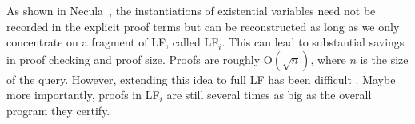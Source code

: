 \documentclass{llncs}
\newcommand{\figfoot}{\vspace{1ex}\hrule}
\newcommand{\fighead}{\hrule\vspace{1.5ex}}
\newcommand{\nil}{\mathsf{nil}}
\newcommand{\vd}{\vdash}
\newcommand{\arrow}{\rightarrow}
\newcommand{\oftp}{\mathord{:}}
\begin{document}

As shown in Necula~\cite{Necula98lics}, the instantiations of
existential variables need not be recorded in the explicit proof terms
but can be reconstructed as long as we only concentrate on a fragment
of LF, called LF$_i$. This can lead to substantial savings in proof
checking and proof size. Proofs are roughly $\mathrm{O}(\sqrt{n})$,
where $n$ is the size of the query. However, extending this idea to
full LF has been difficult \cite{Reed04lfm}. Maybe more importantly,
proofs in LF$_i$ are still several times as big as the overall program
they certify.
\end{document}
